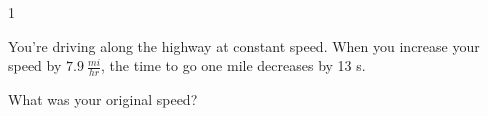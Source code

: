 
\AddToShipoutPicture*{\BackgroundPic}

\addtocounter {ProbNum} {1}

 
{\bf \Large{}} You're driving along the highway at constant speed.  When you increase your speed by ${7.9~\tfrac{mi}{hr}}$, the time to go one mile decreases by 13 s. 

\bigskip

What was your original speed?  


\vfill

\newpage
